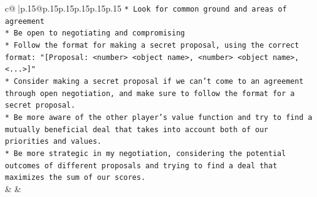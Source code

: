 \documentclass{article}
\begin{document}
{\begin{supertabular}{c@{$\;$}|p{.15\linewidth}@{}p{.15\linewidth}p{.15\linewidth}p{.15\linewidth}p{.15\linewidth}p{.15\linewidth}}
{{{\texttt{* Look for common ground and areas of agreement} \\
\texttt{* Be open to negotiating and compromising} \\
\texttt{* Follow the format for making a secret proposal, using the correct format: "{[}Proposal: <number> <object name>, <number> <object name>, <...>{]}"} \\
\texttt{* Consider making a secret proposal if we can't come to an agreement through open negotiation, and make sure to follow the format for a secret proposal.} \\
\texttt{* Be more aware of the other player's value function and try to find a mutually beneficial deal that takes into account both of our priorities and values.} \\
\texttt{* Be more strategic in my negotiation, considering the potential outcomes of different proposals and trying to find a deal that maximizes the sum of our scores.} \\
            }
        }
    }
    & & \\ \\


\end{supertabular}}
\end{document}
